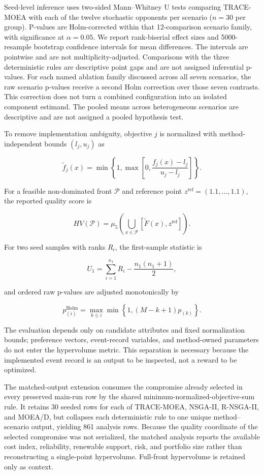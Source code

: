 \documentclass[energies,article,submit,moreauthors]{Definitions/mdpi}
\begin{document}
Seed-level inference uses two-sided Mann--Whitney U tests comparing TRACE-MOEA with each of the twelve stochastic opponents per scenario (\(n=30\) per group). P-values are Holm-corrected within that 12-comparison scenario family, with significance at \(\alpha=0.05\). We report rank-biserial effect sizes and 5000-resample bootstrap confidence intervals for mean differences. The intervals are pointwise and are not multiplicity-adjusted. Comparisons with the three deterministic rules are descriptive point gaps and are not assigned inferential p-values. For each named ablation family discussed across all seven scenarios, the raw scenario p-values receive a second Holm correction over those seven contrasts. This correction does not turn a combined configuration into an isolated component estimand. The pooled means across heterogeneous scenarios are descriptive and are not assigned a pooled hypothesis test.

To remove implementation ambiguity, objective \(j\) is normalized with method-independent bounds \((l_j,u_j)\) as

\[
\tilde f_j(x)=\min\!\left\{1,\max\!\left[0,\frac{f_j(x)-l_j}{u_j-l_j}\right]\right\}.
\]

For a feasible non-dominated front \(\mathcal{P}\) and reference point \(z^{\mathrm{ref}}=(1.1,\ldots,1.1)\), the reported quality score is

\[
HV(\mathcal{P})=\mu_5\!\left(\bigcup_{x\in\mathcal{P}}[\tilde F(x),z^{\mathrm{ref}}]\right).
\]

For two seed samples with ranks \(R_i\), the first-sample statistic is

\[
U_1=\sum_{i=1}^{n_1}R_i-\frac{n_1(n_1+1)}{2},
\]

and ordered raw p-values are adjusted monotonically by

\[
p^{\mathrm{Holm}}_{(i)}=\max_{k\leq i}\min\!\left\{1,(M-k+1)p_{(k)}\right\}.
\]

The evaluation depends only on candidate attributes and fixed normalization bounds; preference vectors, event-record variables, and method-owned parameters do not enter the hypervolume metric. This separation is necessary because the implemented event record is an output to be inspected, not a reward to be optimized.

The matched-output extension consumes the compromise already selected in every preserved main-run row by the shared minimum-normalized-objective-sum rule. It retains 30 seeded rows for each of TRACE-MOEA, NSGA-II, R-NSGA-II, and MOEA/D, but collapses each deterministic rule to one unique method--scenario output, yielding 861 analysis rows. Because the quality coordinate of the selected compromise was not serialized, the matched analysis reports the available cost index, reliability, renewable support, risk, and portfolio size rather than reconstructing a single-point hypervolume. Full-front hypervolume is retained only as context.
\end{document}
